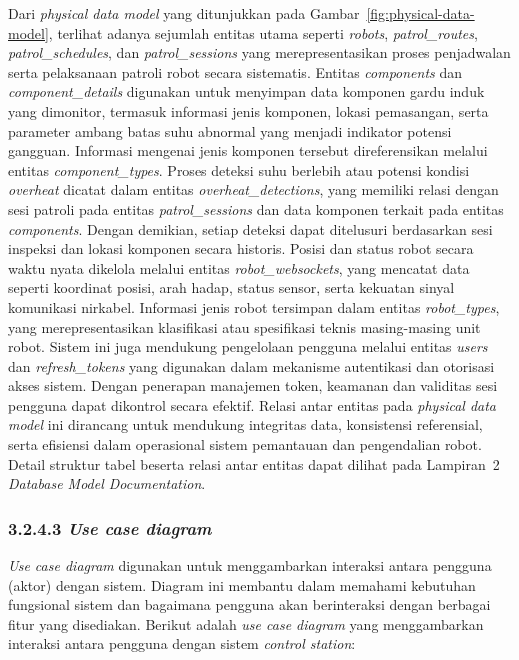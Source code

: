 Dari \emph{physical data model} yang ditunjukkan pada Gambar~\ref{fig:physical-data-model}, terlihat adanya sejumlah entitas utama seperti \emph{robots}, \emph{patrol\_routes}, \emph{patrol\_schedules}, dan \emph{patrol\_sessions} yang merepresentasikan proses penjadwalan serta pelaksanaan patroli robot secara sistematis.  Entitas \emph{components} dan \emph{component\_details} digunakan untuk menyimpan data komponen gardu induk yang dimonitor, termasuk informasi jenis komponen, lokasi pemasangan, serta parameter ambang batas suhu abnormal yang menjadi indikator potensi gangguan. Informasi mengenai jenis komponen tersebut direferensikan melalui entitas \emph{component\_types}. Proses deteksi suhu berlebih atau potensi kondisi \emph{overheat} dicatat dalam entitas \emph{overheat\_detections}, yang memiliki relasi dengan sesi patroli pada entitas \emph{patrol\_sessions} dan data komponen terkait pada entitas \emph{components}. Dengan demikian, setiap deteksi dapat ditelusuri berdasarkan sesi inspeksi dan lokasi komponen secara historis. Posisi dan status robot secara waktu nyata dikelola melalui entitas \emph{robot\_websockets}, yang mencatat data seperti koordinat posisi, arah hadap, status sensor, serta kekuatan sinyal komunikasi nirkabel. Informasi jenis robot tersimpan dalam entitas \emph{robot\_types}, yang merepresentasikan klasifikasi atau spesifikasi teknis masing-masing unit robot. Sistem ini juga mendukung pengelolaan pengguna melalui entitas \emph{users} dan \emph{refresh\_tokens} yang digunakan dalam mekanisme autentikasi dan otorisasi akses sistem. Dengan penerapan manajemen token, keamanan dan validitas sesi pengguna dapat dikontrol secara efektif. Relasi antar entitas pada \emph{physical data model} ini dirancang untuk mendukung integritas data, konsistensi referensial, serta efisiensi dalam operasional sistem pemantauan dan pengendalian robot. Detail struktur tabel beserta relasi antar entitas dapat dilihat pada Lampiran~2 \emph{Database Model Documentation}.

\subsubsection{3.2.4.3 \emph{Use case diagram}}
\emph{Use case diagram} digunakan untuk menggambarkan interaksi antara pengguna (aktor) dengan sistem. Diagram ini membantu dalam memahami kebutuhan fungsional sistem dan bagaimana pengguna akan berinteraksi dengan berbagai fitur yang disediakan. Berikut adalah \emph{use case diagram} yang menggambarkan interaksi antara pengguna dengan sistem \emph{control station}:


